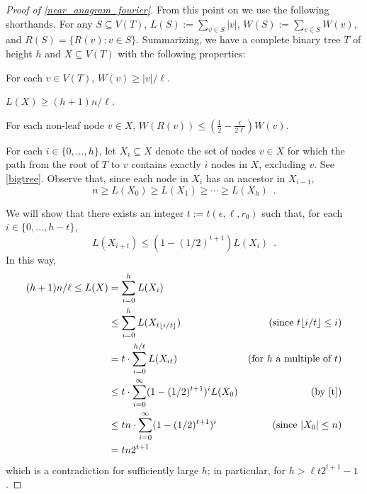 \documentclass{patmorin}
\begin{document}
\begin{proof}[Proof of \cref{near_anagram_fourier}]
  From this point on we use the following shorthands. For any $S\subseteq V(T)$, $L(S):=\sum_{v\in S}|v|$,
  $W(S):=\sum_{v\in S}W(v)$, and $R(S)=\{R(v):v\in S\}$.  Summarizing, we have a complete binary tree $T$ of height $h$ and
  $X\subseteq V(T)$ with the following properties:
  \begin{compactenum}
    \item For each $v\in V(T)$,  $W(v)\ge |v|/\ell$.
    \item $L(X) \ge (h+1)n/\ell$.
    \item For each non-leaf node $v\in X$,
      $W(R(v)) \le (\tfrac{1}{2}-\tfrac{\epsilon}{2\ell})W(v)$.
  \end{compactenum}
  For each $i\in\{0,\ldots,h\}$, let $X_i\subseteq X$ denote the
  set of nodes $v\in X$ for which the path from the root of $T$ to $v$
  contains exactly $i$ nodes in $X$, excluding $v$.  See \cref{bigtree}. Observe that, since each node in $X_i$ has an ancestor in $X_{i-1}$,
  \[  n \ge L(X_0) \ge L(X_1) \ge \cdots\ge L(X_{h}) \enspace . \]

  We will show that there exists an integer $t:=t(\epsilon,\ell,r_0)$ such that, for each $i\in\{0,\ldots,h-t\}$,
  \begin{equation}
     L(X_{i+t}) \le (1-(1/2)^{t+1}) L(X_i) \enspace . \label{t}
  \end{equation}
  In this way,
  \begin{align*}
     (h+1)n/\ell
        \le L(X) & = \sum_{i=0}^{h} L(X_i) \\
           &\le \sum_{i=0}^{h} L(X_{t\floor{i/t}})
             & \text{(since $t\floor{i/t}\le i$)} \\
           & = t\cdot\sum_{i=0}^{h/t} L(X_{it})
             & \text{(for $h$ a multiple of $t$)} \\
           &\le t\cdot\sum_{i=0}^{\infty} (1-(1/2)^{t+1})^i L(X_0)
           & \text{(by \cref{t})}\\
           &\le tn\cdot \sum_{i=0}^{\infty} (1-(1/2)^{t+1})^i
           & \text{(since $|X_0|\le n$)} \\
           & = tn2^{t+1} \\
  \end{align*}
  which is a contradiction for sufficiently large $h$; in particular, for $h > \ell t2^{t+1}-1$.


\end{proof}
\end{document}
